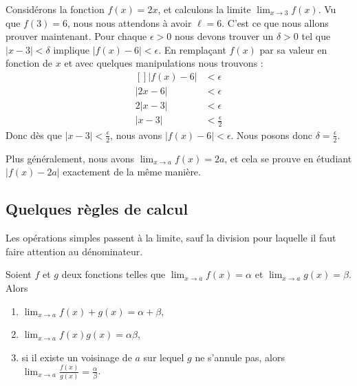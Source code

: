 \begin{example}
	Considérons la fonction \( f(x)=2x\), et calculons la limite \( \lim_{x\to 3} f(x)\). Vu que \( f(3)=6\), nous nous attendons à avoir \( \ell=6\). C'est ce que nous allons prouver maintenant. Pour chaque \( \epsilon>0\) nous devons trouver un \( \delta>0\) tel que \( | x-3 |<\delta\) implique \( | f(x)-6 |<\epsilon\). En remplaçant \( f(x)\) par sa valeur en fonction de \( x\) et avec quelques manipulations nous trouvons :
	\begin{equation}
		\begin{aligned}[]
			| f(x)-6 | & <\epsilon                \\
			| 2x-6 |   & <\epsilon                \\
			2| x-3 |   & <\epsilon                \\
			| x-3 |    & <\frac{ \epsilon }{2}
		\end{aligned}
	\end{equation}
	Donc dès que \( | x-3 |<\frac{ \epsilon }{2}\), nous avons \( | f(x)-6 |<\epsilon\). Nous posons donc \( \delta=\frac{ \epsilon }{2}\).

	Plus généralement, nous avons \( \lim_{x\to a} f(x)=2a\), et cela se prouve en étudiant \( | f(x)-2a |\) exactement de la même manière.
\end{example}

\subsection{Quelques règles de calcul}

Les opérations simples passent à la limite, sauf la division pour laquelle il faut faire attention au dénominateur.
\begin{proposition}     \label{PropOpsSimplesLimites}
	Soient \( f\) et \( g\) deux fonctions telles que \( \lim_{x\to a} f(x)=\alpha\) et \( \lim_{x\to a} g(x)=\beta\). Alors
	\begin{enumerate}
		\item
		      \( \lim_{x\to a} f(x)+g(x)=\alpha+\beta\),
		\item
		      \( \lim_{x\to a} f(x)g(x)=\alpha\beta\),
		\item
		      si il existe un voisinage de \( a\) sur lequel \( g\) ne s'annule pas, alors \( \lim_{x\to a} \frac{ f(x) }{ g(x) }=\frac{ \alpha }{ \beta }\).
	\end{enumerate}
\end{proposition}

